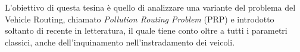 L’obiettivo di questa tesina è quello di analizzare una variante del problema del Vehicle Routing, chiamato \emph{Pollution Routing Problem} (PRP) e introdotto soltanto di recente in letteratura, il quale tiene conto oltre a tutti i parametri classici, anche dell’inquinamento nell’instradamento dei veicoli.